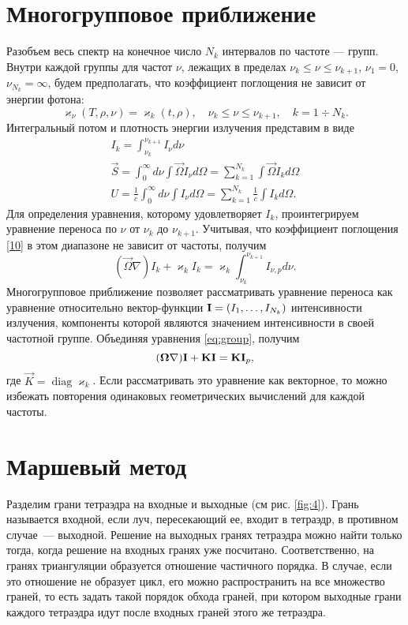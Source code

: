 \section {Многогрупповое приближение}
Разобъем весь спектр на конечное число $N_k$ интервалов по частоте --- групп. Внутри каждой группы для частот $\nu$, лежащих в пределах $\nu_k \leqslant \nu \leqslant \nu_{k+1}$, $\nu_1 = 0$, $\nu_{N_k} = \infty$, будем предполагать, что коэффициент поглощения не зависит от энергии фотона:
\begin {equation}
\varkappa_\nu (T, \rho, \nu) = \varkappa_k(t, \rho), \quad \nu_k \leqslant \nu \leqslant \nu_{k+1}, \quad k = 1 \div N_k.
\label{10}
\end {equation}
Интегральный потом и плотность энергии излучения представим в виде
\begin {gather}
I_k = \int_{\nu_k}^{\nu_{k+1}} I_\nu d \nu\\
\vec S = \int_0^\infty d\nu \int \vec\Omega I_\nu d\Omega = \sum_{k=1}^{N_k} \int \vec\Omega I_k d\Omega\\
U = \frac{1}{c} \int_0^\infty d\nu \int I_\nu d \Omega = \sum_{k=1}^{N_k} \frac{1}{c} \int I_k d \Omega.
\end {gather}
Для определения уравнения, которому удовлетворяет $I_k$, проинтегрируем уравнение переноса по $\nu$ от $\nu_k$ до $\nu_{k+1}$. Учитывая, что коэффициент поглощения \eqref{10} в этом диапазоне не зависит от частоты, получим
\begin {equation}
(\vec\Omega \nabla )I_k + \varkappa_k I_k = \varkappa_k \int_{\nu_k}^{\nu_{k+1}} I_{\nu, p} d \nu.
\label{eq:group}
\end {equation}
Многогрупповое приближение позволяет рассматривать уравнение переноса как уравнение относительно вектор-функции $\avec I = (I_1, \dots, I_{N_k}) $ интенсивности излучения, компоненты которой являются значением интенсивности в своей частотной группе. 
Объединяя уравнения \eqref{eq:group}, получим
\begin {equation}
(\vec\Omega \nabla ) \avec I + \vec K \avec I = \vec K \avec I_{p},
\end {equation} 
где $\vec K = \operatorname{diag} \varkappa_k$. Если рассматривать это уравнение как векторное, то можно избежать повторения одинаковых геометрических вычислений для каждой частоты.
\section{Маршевый метод}
Разделим грани тетраэдра на входные и выходные (см рис. \ref{fig:4}). Грань называется входной, если луч, пересекающий ее, входит в тетраэдр, в противном случае~--- выходной. Решение на выходных гранях тетраэдра можно найти только тогда, когда решение на входных гранях уже посчитано. Соответственно, на гранях триангуляции образуется отношение частичного порядка. В случае, если это отношение не образует цикл, его можно распространить на все множество граней, то есть задать такой порядок обхода граней, при котором выходные грани каждого тетраэдра идут после входных граней этого же тетраэдра. 

